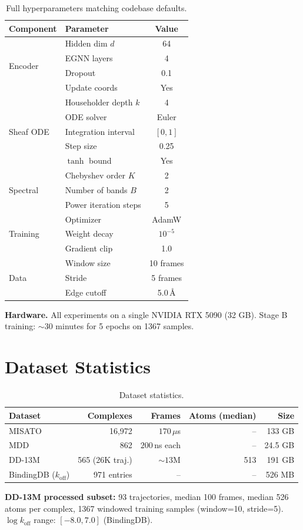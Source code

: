 \documentclass{article}
\begin{document}
\begin{table}[h]
\caption{Full hyperparameters matching codebase defaults.}
\centering
\footnotesize
\begin{tabular}{@{}llc@{}}
\toprule
\textbf{Component} & \textbf{Parameter} & \textbf{Value} \\
\midrule
\multirow{4}{*}{Encoder} & Hidden dim $d$ & 64 \\
 & EGNN layers & 4 \\
 & Dropout & 0.1 \\
 & Update coords & Yes \\
\midrule
\multirow{5}{*}{Sheaf ODE} & Householder depth $k$ & 4 \\
 & ODE solver & Euler \\
 & Integration interval & $[0, 1]$ \\
 & Step size & 0.25 \\
 & $\tanh$ bound & Yes \\
\midrule
\multirow{3}{*}{Spectral} & Chebyshev order $K$ & 2 \\
 & Number of bands $B$ & 2 \\
 & Power iteration steps & 5 \\
\midrule
\multirow{3}{*}{Training} & Optimizer & AdamW \\
 & Weight decay & $10^{-5}$ \\
 & Gradient clip & 1.0 \\
\midrule
\multirow{3}{*}{Data} & Window size & 10 frames \\
 & Stride & 5 frames \\
 & Edge cutoff & 5.0\,\AA \\
\bottomrule
\end{tabular}
\end{table}

\textbf{Hardware.} All experiments on a single NVIDIA RTX 5090 (32 GB).
Stage B training: ${\sim}30$ minutes for 5 epochs on 1367 samples.

\section{Dataset Statistics}
\label{app:datasets}

\begin{table}[h]
\caption{Dataset statistics.}
\centering
\footnotesize
\begin{tabular}{@{}lrrrr@{}}
\toprule
\textbf{Dataset} & \textbf{Complexes} & \textbf{Frames} & \textbf{Atoms (median)} & \textbf{Size} \\
\midrule
MISATO & 16,972 & $170\,\mu$s & -- & 133 GB \\
MDD & 862 & $200\,$ns each & -- & 24.5 GB \\
DD-13M & 565 (26K traj.) & ${\sim}13$M & 513 & 191 GB \\
BindingDB ($k_\text{off}$) & 971 entries & -- & -- & 526 MB \\
\bottomrule
\end{tabular}
\end{table}

\textbf{DD-13M processed subset:} 93 trajectories, median 100 frames,
median 526 atoms per complex, 1367 windowed training samples
(window=10, stride=5).
$\log k_\text{off}$ range: $[-8.0, 7.0]$ (BindingDB).
\end{document}
